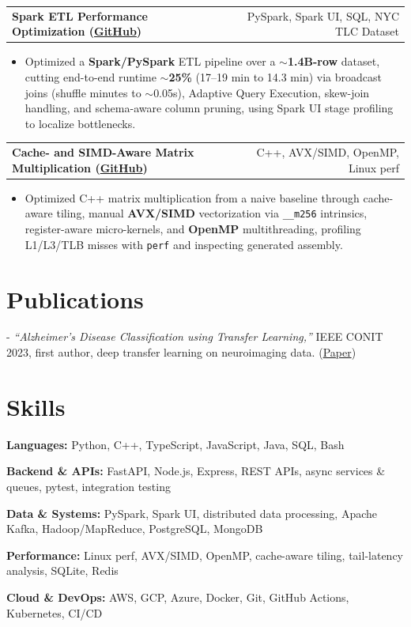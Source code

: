 \documentclass[letterpaper,11pt]{article}
\makeatletter
\newcommand{\projItem}[2]{%
  \vspace{2pt}
  \begin{tabular*}{\textwidth}{@{}l@{\extracolsep{\fill}}r@{}}
    \textbf{#1} & #2 \\
  \end{tabular*}\par\vspace{-3pt}
}
\newcommand{\skillLine}[2]{\textbf{#1:} #2\par\vspace{1.5pt}}
\newcommand{\inlineBlock}[1]{{\setlength{\leftskip}{0.18in}\small #1\par}}
\makeatother
\begin{document}
\projItem{Spark ETL Performance Optimization {\normalfont\small(\href{https://github.com/Deva-1903/Spark-ETL-Optimization}{GitHub})}}{PySpark, Spark UI, SQL, NYC TLC Dataset}
\begin{itemize}
  \item Optimized a \textbf{Spark/PySpark} ETL pipeline over a \textbf{$\sim$1.4B-row} dataset, cutting end-to-end runtime \textbf{$\sim$25\%} (17--19 min to 14.3 min) via broadcast joins (shuffle minutes to $\sim$0.05s), Adaptive Query Execution, skew-join handling, and schema-aware column pruning, using Spark UI stage profiling to localize bottlenecks.
\end{itemize}

\projItem{Cache- and SIMD-Aware Matrix Multiplication {\normalfont\small(\href{https://github.com/Deva-1903/cs690pf}{GitHub})}}{C++, AVX/SIMD, OpenMP, Linux perf}
\begin{itemize}
  \item Optimized C++ matrix multiplication from a naive baseline through cache-aware tiling, manual \textbf{AVX/SIMD} vectorization via \texttt{\_\_m256} intrinsics, register-aware micro-kernels, and \textbf{OpenMP} multithreading, profiling L1/L3/TLB misses with \texttt{perf} and inspecting generated assembly.
\end{itemize}

\section{Publications}
\vspace{2pt}
\inlineBlock{- \textit{``Alzheimer's Disease Classification using Transfer Learning,''} IEEE CONIT 2023, first author, deep transfer learning on neuroimaging data. {\normalfont\small(\href{https://ieeexplore.ieee.org/document/10205760}{Paper})}}

\section{Skills}
\skillLine{Languages}{Python, C++, TypeScript, JavaScript, Java, SQL, Bash}
\skillLine{Backend \& APIs}{FastAPI, Node.js, Express, REST APIs, async services \& queues, pytest, integration testing}
\skillLine{Data \& Systems}{PySpark, Spark UI, distributed data processing, Apache Kafka, Hadoop/MapReduce, PostgreSQL, MongoDB}
\skillLine{Performance}{Linux perf, AVX/SIMD, OpenMP, cache-aware tiling, tail-latency analysis, SQLite, Redis}
\skillLine{Cloud \& DevOps}{AWS, GCP, Azure, Docker, Git, GitHub Actions, Kubernetes, CI/CD}
\end{document}
